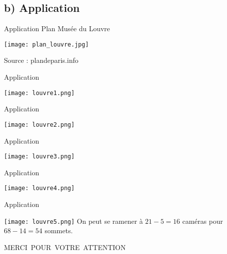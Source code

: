 \documentclass{beamer}
\begin{document}
\subsection{b) Application}
\begin{frame}{Application}
    Plan Musée du Louvre
      \begin{center}
        \texttt{[image: plan\_louvre.jpg]}
        
        Source : plandeparis.info
    \end{center}
\end{frame}
\begin{frame}{Application}
    \begin{center}
        \texttt{[image: louvre1.png]}
    \end{center}
\end{frame}
\begin{frame}{Application}
    \begin{center}
        \texttt{[image: louvre2.png]}
    \end{center}
\end{frame}
\begin{frame}{Application}
    \begin{center}
        \texttt{[image: louvre3.png]}
    \end{center}
\end{frame}
\begin{frame}{Application}
    \begin{center}
        \texttt{[image: louvre4.png]}
    \end{center}
\end{frame}
\begin{frame}{Application}
    \begin{center}
        \texttt{[image: louvre5.png]}
        On peut se ramener à $21 - 5 = 16$ caméras pour $68 - 14 = 54$ sommets.
    \end{center}
\end{frame}
\begin{frame}{}
    \begin{center}
        MERCI\ POUR\ VOTRE\ ATTENTION 
    \end{center}    
\end{frame}
\end{document}
